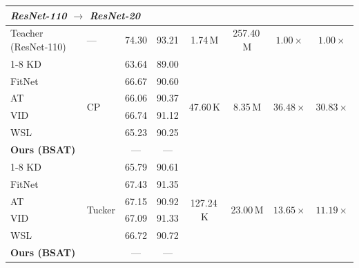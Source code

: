 \documentclass[conference]{IEEEtran}
\begin{document}
\begin{table}[t]
\begin{tabular}{llcccccc}
    \multicolumn{8}{l}{\textit{ResNet-110 $\to$ ResNet-20}} \\
    \midrule
    Teacher (ResNet-110) & — & 74.30 & 93.21 & 1.74\,M & 257.40\,M & $1.00\times$ & $1.00\times$ \\
    \cline{1-8}
    KD \cite{hinton2015distilling}                 & \multirow{6}{*}{CP}     & 63.64 & 89.00 & \multirow{6}{*}{47.60\,K} & \multirow{6}{*}{8.35\,M} & \multirow{6}{*}{$36.48\times$}     & \multirow{6}{*}{$30.83\times$} \\
    FitNet \cite{romero2015fitnetshintsdeepnets}   &                         & 66.67 & 90.60 & & & & \\
    AT \cite{zagoruyko2016paying}                  &                         & 66.06 & 90.37 & & & & \\
    VID \cite{ahn2019variational}                  &                         & 66.74 & 91.12 & & & & \\
    WSL \cite{zhou2021rethinking}                  &                         & 65.23 & 90.25 & & & & \\
    \textbf{Ours (BSAT)}                           &                         & — & — & & & & \\
    \cline{1-8}
    KD \cite{hinton2015distilling}                 & \multirow{6}{*}{Tucker} & 65.79 & 90.61 & \multirow{6}{*}{127.24\,K} & \multirow{6}{*}{23.00\,M} & \multirow{6}{*}{$13.65\times$}    & \multirow{6}{*}{$11.19\times$} \\
    FitNet \cite{romero2015fitnetshintsdeepnets}   &                         & 67.43 & 91.35 & & & & \\
    AT \cite{zagoruyko2016paying}                  &                         & 67.15 & 90.92 & & & & \\
    VID \cite{ahn2019variational}                  &                         & 67.09 & 91.33 & & & & \\
    WSL \cite{zhou2021rethinking}                  &                         & 66.72 & 90.72 & & & & \\
    \textbf{Ours (BSAT)}                           &                         & — & — & & & & \\
    \midrule


\end{tabular}
\end{table}
\end{document}

